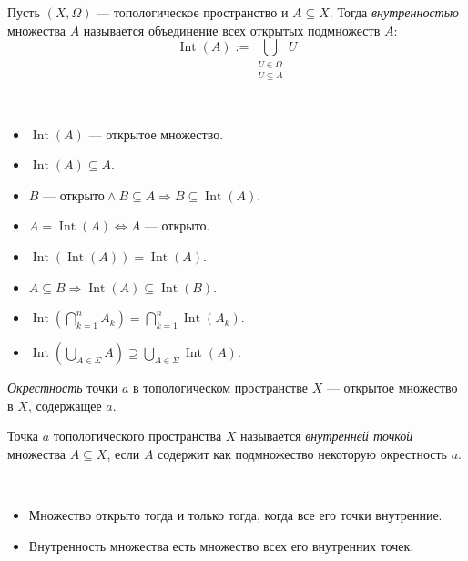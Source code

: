 \documentclass[12pt,a4paper]{article}
\DeclareMathOperator{\Int}{Int}
\begin{document}
    \begin{definition}
        Пусть $(X, \Omega)$ --- топологическое пространство и $A \subseteq X$. Тогда \emph{внутренностью} множества $A$ называется
        объединение всех открытых подмножеств $A$:
        \[\Int(A) := \bigcup_{\substack{U \in \Omega\\U \subseteq A}} U\]
    \end{definition}

    \begin{theorem}\ 
        \begin{itemize}
            \item $\Int(A)$ --- открытое множество.
            \item $\Int(A) \subseteq A$.
            \item $B\text{ --- открыто} \wedge B \subseteq A \Rightarrow B \subseteq \Int(A)$.
            \item $A = \Int(A) \Leftrightarrow A \text{ --- открыто}$.
            \item $\Int(\Int(A)) = \Int(A)$.
            \item $A \subseteq B \Rightarrow \Int(A) \subseteq \Int(B)$.
            \item $\Int(\bigcap_{k=1}^n A_k) = \bigcap_{k=1}^n \Int(A_k)$.
            \item $\Int(\bigcup_{A \in \Sigma} A) \supseteq \bigcup_{A \in \Sigma} \Int(A)$.
        \end{itemize}
    \end{theorem}

    \begin{definition}
        \emph{Окрестность} точки $a$ в топологическом пространстве $X$ --- открытое множество в $X$, содержащее $a$.

        Точка $a$ топологического пространства $X$ называется \emph{внутренней точкой} множества $A \subseteq X$, если $A$ содержит как подмножество некоторую окрестность $a$.
    \end{definition}

    \begin{theorem}\ 
        \begin{itemize}
            \item Множество открыто тогда и только тогда, когда все его точки внутренние.
            \item Внутренность множества есть множество всех его внутренних точек.
        \end{itemize}
    \end{theorem}
\end{document}
